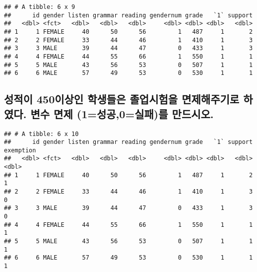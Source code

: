 \documentclass[
]{article}
\newenvironment{Shaded}{\begin{snugshade}}{\end{snugshade}}
\newcommand{\DecValTok}[1]{\textcolor[rgb]{0.00,0.00,0.81}{#1}}
\newcommand{\KeywordTok}[1]{\textcolor[rgb]{0.13,0.29,0.53}{\textbf{#1}}}
\newcommand{\NormalTok}[1]{#1}
\newcommand{\OperatorTok}[1]{\textcolor[rgb]{0.81,0.36,0.00}{\textbf{#1}}}
\newcommand{\StringTok}[1]{\textcolor[rgb]{0.31,0.60,0.02}{#1}}
\begin{document}
\begin{verbatim}
## # A tibble: 6 x 9
##      id gender listen grammar reading gendernum grade   `1` support
##   <dbl> <fct>   <dbl>   <dbl>   <dbl>     <dbl> <dbl> <dbl>   <dbl>
## 1     1 FEMALE     40      50      56         1   487     1       2
## 2     2 FEMALE     33      44      46         1   410     1       3
## 3     3 MALE       39      44      47         0   433     1       3
## 4     4 FEMALE     44      55      66         1   550     1       1
## 5     5 MALE       43      56      53         0   507     1       1
## 6     6 MALE       57      49      53         0   530     1       1
\end{verbatim}

\hypertarget{uxc131uxc801uxc774-450uxc774uxc0c1uxc778-uxd559uxc0dduxb4e4uxc740-uxc878uxc5c5uxc2dcuxd5d8uxc744-uxba74uxc81cuxd574uxc8fcuxae30uxb85c-uxd558uxc600uxb2e4.-uxbcc0uxc218-uxba74uxc81c-1uxc131uxacf50uxc2e4uxd328uxb97c-uxb9ccuxb4dcuxc2dcuxc624.}{%
\subsection{성적이 450이상인 학생들은 졸업시험을 면제해주기로 하였다.
변수 면제 (1=성공,0=실패)를
만드시오.}\label{uxc131uxc801uxc774-450uxc774uxc0c1uxc778-uxd559uxc0dduxb4e4uxc740-uxc878uxc5c5uxc2dcuxd5d8uxc744-uxba74uxc81cuxd574uxc8fcuxae30uxb85c-uxd558uxc600uxb2e4.-uxbcc0uxc218-uxba74uxc81c-1uxc131uxacf50uxc2e4uxd328uxb97c-uxb9ccuxb4dcuxc2dcuxc624.}}

\begin{Shaded}
\end{Shaded}

\begin{verbatim}
## # A tibble: 6 x 10
##      id gender listen grammar reading gendernum grade   `1` support exemption
##   <dbl> <fct>   <dbl>   <dbl>   <dbl>     <dbl> <dbl> <dbl>   <dbl>     <dbl>
## 1     1 FEMALE     40      50      56         1   487     1       2         1
## 2     2 FEMALE     33      44      46         1   410     1       3         0
## 3     3 MALE       39      44      47         0   433     1       3         0
## 4     4 FEMALE     44      55      66         1   550     1       1         1
## 5     5 MALE       43      56      53         0   507     1       1         1
## 6     6 MALE       57      49      53         0   530     1       1         1
\end{verbatim}
\end{document}
